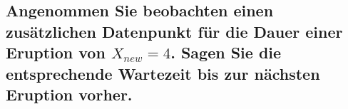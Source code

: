 \documentclass[12pt,a4paper]{article}
\begin{document}
\subsection{\texorpdfstring{Angenommen Sie beobachten einen zusätzlichen
Datenpunkt für die Dauer einer Eruption von \(X_{new}=4\). Sagen Sie die
entsprechende Wartezeit bis zur nächsten Eruption
vorher.}{Angenommen Sie beobachten einen zusätzlichen Datenpunkt für die Dauer einer Eruption von X\_\{new\}=4. Sagen Sie die entsprechende Wartezeit bis zur nächsten Eruption vorher.}}\label{angenommen-sie-beobachten-einen-zusuxe4tzlichen-datenpunkt-fuxfcr-die-dauer-einer-eruption-von-x_new4.-sagen-sie-die-entsprechende-wartezeit-bis-zur-nuxe4chsten-eruption-vorher.}
\end{document}
